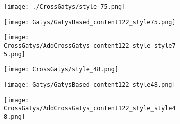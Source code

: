   
  \begin{figure}[!htbp]
    \centering
    \begin{subfigure}[b]{0.3\linewidth}
      \texttt{[image: ./CrossGatys/style\_75.png]}
    \end{subfigure}
    \begin{subfigure}[b]{0.3\linewidth}
      \texttt{[image: Gatys/GatysBased\_content122\_style75.png]}
    \end{subfigure}
    \begin{subfigure}[b]{0.3\linewidth}
      \texttt{[image: CrossGatys/AddCrossGatys\_content122\_style\_style75.png]}
    \end{subfigure}
  
    \begin{subfigure}[b]{0.3\linewidth}
      \texttt{[image: CrossGatys/style\_48.png]}
    \end{subfigure}
    \begin{subfigure}[b]{0.3\linewidth}
      \texttt{[image: Gatys/GatysBased\_content122\_style48.png]}
    \end{subfigure}
    \begin{subfigure}[b]{0.3\linewidth}
      \texttt{[image: CrossGatys/AddCrossGatys\_content122\_style\_style48.png]}
    \end{subfigure}
  

\end{figure}
